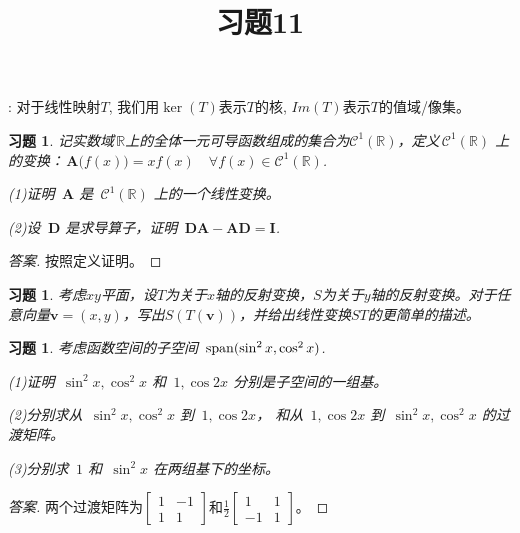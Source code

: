 \documentclass[UTF8]{ctexart}
\newtheorem{ex}[thm]{习题}
\begin{document}
\title{习题11}

\date{}

\maketitle

\vspace{-1cm}





: 对于线性映射$T$, 我们用$\ker(T)$表示$T$的核, $Im (T)$表示$T$的值域/像集。

\medskip


\begin{ex}
	记实数域$\,\mathbb{R}$上的全体一元可导函数组成的集合为$\mathcal{C}^1(\mathbb{R})$，定义$\,\mathcal{C}^1(\mathbb{R})$ 上的变换：$\,\boldsymbol{A}\big(f(x)\big) = xf(x) \quad \forall f(x) \in \mathcal{C}^1(\mathbb{R})$.
	
	(1)证明 $\,\boldsymbol{A}$ 是 $\,\mathcal{C}^1(\mathbb{R})$ 上的一个线性变换。
	
	(2)设 $\,\boldsymbol{D}$ 是求导算子，证明 $\,\boldsymbol{D}\boldsymbol{A} - \boldsymbol{A}\boldsymbol{D} = \boldsymbol{I}$.
\end{ex}
\begin{proof}[答案]
按照定义证明。
\end{proof}
\begin{ex}
	考虑$xy$平面，设$T$为关于$x$轴的反射变换，$S$为关于$y$轴的反射变换。对于任意向量$\mathbf{v}=(x,y)$，写出$S(T(\mathbf{v}))$，并给出线性变换$ST$的更简单的描述。
\end{ex}


\begin{ex}
	考虑函数空间的子空间 $\,{\rm span}(\sin^2x, \cos^2x)$.
	
	(1)证明 $\,\sin^2x, \cos^2 x$ 和 $\,1, \cos 2x$ 分别是子空间的一组基。
	
	(2)分别求从 $\,\sin^2x, \cos^2 x$ 到 $\,1, \cos 2x$， 和从 $\,1, \cos 2x$ 到 $\,\sin^2x, \cos^2 x$ 的过渡矩阵。
	
	(3)分别求 $\,1$ 和 $\,\sin^2 x$ 在两组基下的坐标。
\end{ex}
\begin{proof}[答案]
	两个过渡矩阵为$\left[\begin{array}{rr} 1& -1 \\ 1& 1 \end{array}\right]$和$\frac12\left[\begin{array}{rr} 1& 1 \\ -1& 1\end{array}\right]$。
\end{proof}
\end{document}

